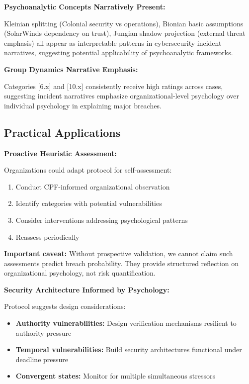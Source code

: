 \documentclass[11pt,a4paper]{article}
\begin{document}
\textbf{Psychoanalytic Concepts Narratively Present:}

Kleinian splitting (Colonial security vs operations), Bionian basic assumptions (SolarWinds dependency on trust), Jungian shadow projection (external threat emphasis) all appear as interpretable patterns in cybersecurity incident narratives, suggesting potential applicability of psychoanalytic frameworks.

\textbf{Group Dynamics Narrative Emphasis:}

Categories [6.x] and [10.x] consistently receive high ratings across cases, suggesting incident narratives emphasize organizational-level psychology over individual psychology in explaining major breaches.

\subsection{Practical Applications}

\textbf{Proactive Heuristic Assessment:}

Organizations could adapt protocol for self-assessment:
\begin{enumerate}
\item Conduct CPF-informed organizational observation
\item Identify categories with potential vulnerabilities
\item Consider interventions addressing psychological patterns
\item Reassess periodically
\end{enumerate}

\textbf{Important caveat:} Without prospective validation, we cannot claim such assessments predict breach probability. They provide structured reflection on organizational psychology, not risk quantification.

\textbf{Security Architecture Informed by Psychology:}

Protocol suggests design considerations:
\begin{itemize}
\item \textbf{Authority vulnerabilities:} Design verification mechanisms resilient to authority pressure
\item \textbf{Temporal vulnerabilities:} Build security architectures functional under deadline pressure
\item \textbf{Convergent states:} Monitor for multiple simultaneous stressors
\end{itemize}
\end{document}
